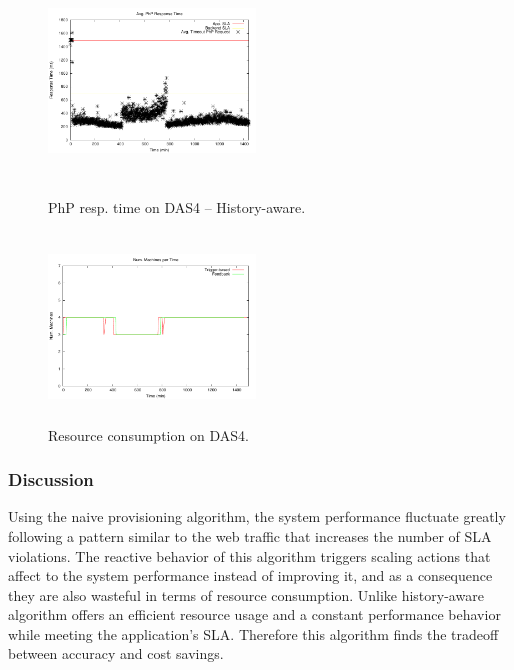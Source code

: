 \begin{figure}
\begin{center}
\includegraphics[width=0.49\textwidth, height=6cm]{./images/homogeneous/avgTimeout_PhP_history}
\end{center}
\caption{PhP resp. time on DAS4 -- History-aware.}
\label{historyDas4}
\end{figure}

\begin{figure}
\begin{center}
\includegraphics[width=0.49\textwidth, height=5cm]{./images/homogeneous/numMachinesComp}
\end{center}
\caption{Resource consumption on DAS4.}
\label{resComDas4}
\end{figure}

\subsubsection{Discussion}

Using the naive provisioning algorithm, the system performance fluctuate greatly following a pattern similar to the web traffic that increases the number of SLA violations. The reactive behavior of this algorithm triggers scaling actions that affect to the system performance instead of improving it, and as a consequence they are also wasteful in terms of resource consumption. Unlike history-aware algorithm offers an efficient resource usage and a constant performance behavior while meeting the application's SLA. Therefore this algorithm finds the tradeoff between accuracy and cost savings.


